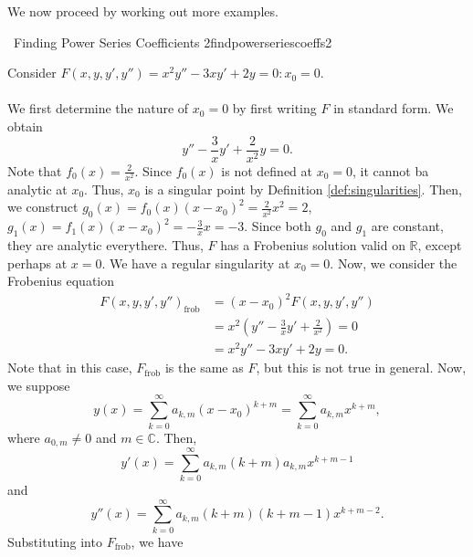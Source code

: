         We now proceed by working out more examples.
        \begin{example}{\Difficulty\,\Difficulty\,\,Finding Power Series Coefficients 2}{findpowerseriescoeffs2}
            
            Consider \(F(x,y,y',y'')=x^2y''-3xy'+2y=0:x_0=0\).
            \\
            \\
            We first determine the nature of \(x_0=0\) by first writing \(F\) in standard form. We obtain
            \begin{equation*}
                y''-\frac{3}{x}y'+\frac{2}{x^2}y=0.
            \end{equation*} 
            Note that \(f_0(x)=\frac{2}{x^2}\). Since \(f_0(x)\) is not defined at \(x_0=0\), it cannot ba analytic at \(x_0\). Thus, \(x_0\) is a singular point by Definition \ref{def:singularities}. Then, we construct \(g_0(x)=f_0(x)(x-x_0)^2=\frac{2}{x^2}x^2=2\), \(g_1(x)=f_1(x)(x-x_0)^2=-\frac{3}{x}x=-3\). Since both \(g_0\) and \(g_1\) are constant, they are analytic everythere. Thus, \(F\) has a Frobenius solution valid on \(\mathbb{R}\), except perhaps at \(x=0\). We have a regular singularity at \(x_0=0\). Now, we consider the Frobenius equation 
            \begin{align*}
                F(x,y,y',y'')_{\text{frob}}&=(x-x_0)^2F(x,y,y',y'') \\
                &=x^2\left(y''-\frac{3}{x}y'+\frac{2}{x^2}\right)=0 \\
                &=x^2y''-3xy'+2y=0.
            \end{align*}
            Note that in this case, \(F_{\text{frob}}\) is the same as \(F\), but this is not true in general. Now, we suppose
            \begin{equation*}
                y(x)=\sum_{k=0}^\infty a_{k,m}(x-x_0)^{k+m}=\sum_{k=0}^\infty a_{k,m}x^{k+m},
            \end{equation*}
            where \(a_{0,m}\neq0\) and \(m\in\mathbb{C}\). Then,
            \begin{equation*}
                y'(x)=\sum_{k=0}^\infty a_{k,m}(k+m)a_{k,m}x^{k+m-1}
            \end{equation*}
            and
            \begin{equation*}
                y''(x)=\sum_{k=0}^\infty a_{k,m}(k+m)(k+m-1)x^{k+m-2}.
            \end{equation*}
            Substituting into \(F_{\text{frob}}\), we have
            \begin{align*}

\end{align*}
\end{example}
